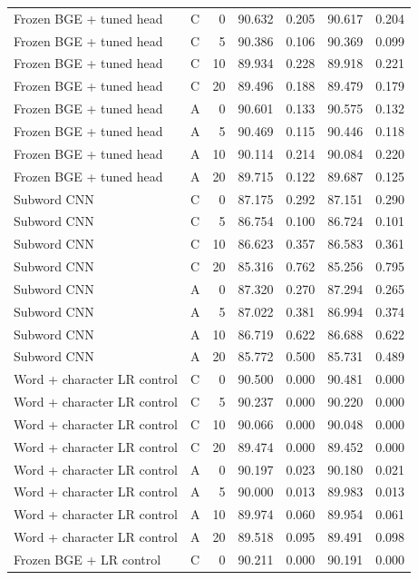\begin{longtable}{llrrrrr}
Frozen BGE + tuned head & C & 0 & 90.632 & 0.205 & 90.617 & 0.204 \\
Frozen BGE + tuned head & C & 5 & 90.386 & 0.106 & 90.369 & 0.099 \\
Frozen BGE + tuned head & C & 10 & 89.934 & 0.228 & 89.918 & 0.221 \\
Frozen BGE + tuned head & C & 20 & 89.496 & 0.188 & 89.479 & 0.179 \\
Frozen BGE + tuned head & A & 0 & 90.601 & 0.133 & 90.575 & 0.132 \\
Frozen BGE + tuned head & A & 5 & 90.469 & 0.115 & 90.446 & 0.118 \\
Frozen BGE + tuned head & A & 10 & 90.114 & 0.214 & 90.084 & 0.220 \\
Frozen BGE + tuned head & A & 20 & 89.715 & 0.122 & 89.687 & 0.125 \\
Subword CNN & C & 0 & 87.175 & 0.292 & 87.151 & 0.290 \\
Subword CNN & C & 5 & 86.754 & 0.100 & 86.724 & 0.101 \\
Subword CNN & C & 10 & 86.623 & 0.357 & 86.583 & 0.361 \\
Subword CNN & C & 20 & 85.316 & 0.762 & 85.256 & 0.795 \\
Subword CNN & A & 0 & 87.320 & 0.270 & 87.294 & 0.265 \\
Subword CNN & A & 5 & 87.022 & 0.381 & 86.994 & 0.374 \\
Subword CNN & A & 10 & 86.719 & 0.622 & 86.688 & 0.622 \\
Subword CNN & A & 20 & 85.772 & 0.500 & 85.731 & 0.489 \\
Word + character LR control & C & 0 & 90.500 & 0.000 & 90.481 & 0.000 \\
Word + character LR control & C & 5 & 90.237 & 0.000 & 90.220 & 0.000 \\
Word + character LR control & C & 10 & 90.066 & 0.000 & 90.048 & 0.000 \\
Word + character LR control & C & 20 & 89.474 & 0.000 & 89.452 & 0.000 \\
Word + character LR control & A & 0 & 90.197 & 0.023 & 90.180 & 0.021 \\
Word + character LR control & A & 5 & 90.000 & 0.013 & 89.983 & 0.013 \\
Word + character LR control & A & 10 & 89.974 & 0.060 & 89.954 & 0.061 \\
Word + character LR control & A & 20 & 89.518 & 0.095 & 89.491 & 0.098 \\
Frozen BGE + LR control & C & 0 & 90.211 & 0.000 & 90.191 & 0.000 \\

\end{longtable}

